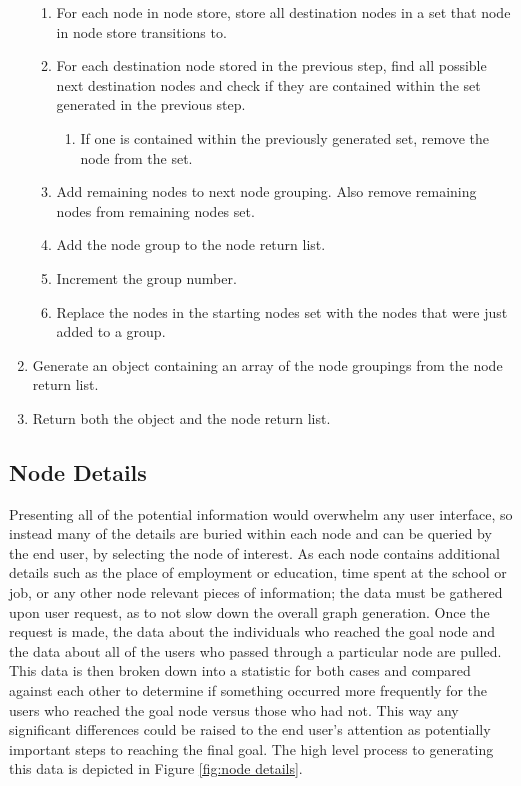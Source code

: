 \begin{enumerate}
\begin{enumerate}
     \item For each node in node store, store all destination nodes in a set
     that node in node store transitions to.
     \item For each destination node stored in the previous step, find all
     possible next destination nodes and check if they are contained within the
     set generated in the previous step.
     \begin{enumerate}
       \item If one is contained within the previously generated set, remove
       the node from the set.
     \end{enumerate}
     \item Add remaining nodes to next node grouping.  Also remove remaining
     nodes from remaining nodes set.
     \item Add the node group to the node return list.
     \item Increment the group number.
     \item Replace the nodes in the starting nodes set with the nodes that
     were just added to a group.
   \end{enumerate} 
   \item Generate an object containing an array of the node groupings from
   the node return list.
   \item Return both the object and the node return list.
 \end{enumerate}



\subsection{Node Details}
Presenting all of the potential information would overwhelm any user interface,
so instead many of the details are buried within each node and can be queried
by the end user, by selecting the node of interest.  As each node contains
additional details such as the place of employment or education, time spent at
the school or job, or any other node relevant pieces of information; the data
must be gathered upon user request, as to not slow down the overall graph
generation.  Once the request is made, the data about the individuals who
reached the goal node and the data about all of the users who passed through a
particular node are pulled.  This data is then broken down into a statistic for
both cases and compared against each other to determine if something occurred
more frequently for the users who reached the goal node versus those who had
not.  This way any significant differences could be raised to the end user's
attention as potentially important steps to reaching the final goal.  The high
level process to generating this data is depicted in Figure \ref{fig:node
details}.

